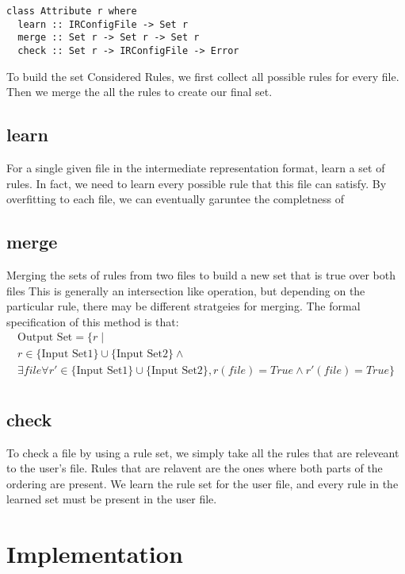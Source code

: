\begin{lstlisting}
class Attribute r where
  learn :: IRConfigFile -> Set r
  merge :: Set r -> Set r -> Set r
  check :: Set r -> IRConfigFile -> Error
\end{lstlisting} 

To build the set Considered Rules, we first collect all possible rules for every file.
Then we merge the all the rules to create our final set.

\subsection{learn}
  For a single given file in the intermediate representation format, learn a set of rules.
  In fact, we need to learn every possible rule that this file can satisfy.
  By overfitting to each file, we can eventually garuntee the completness of \app

\subsection{merge}
  Merging the sets of rules from two files to build a new set that is true over both files
  This is generally an intersection like operation, but depending on the particular rule, there may be different stratgeies for merging.
  The formal specification of this method is that:
  \begin{multline*}
  \text{Output Set} = \{r \mid \\
    r \in \text{\{Input Set1\}} \cup \text{\{Input Set2\}} \land \\
    \exists file \forall r' \in \text{\{Input Set1\}} \cup \text{\{Input Set2\}}, r(file) = True \land r'(file) = True \} \\
  \end{multline*}

\subsection{check}
  To check a file by using a rule set, we simply take all the rules that are releveant to the user's file.
  Rules that are relavent are the ones where both parts of the ordering are present.
  We learn the rule set for the user file, and every rule in the learned set must be present in the user file.

\section{Implementation}

